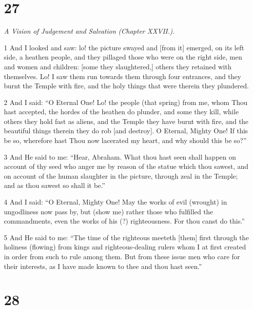 \chapter{27}

\par \textit{A Vision of Judgement and Salvation (Chapter XXVII.).}

\par 1 And I looked and saw: lo! the picture swayed and [from it] emerged, on its left side, a heathen people, and they pillaged those who were on the right side, men and women and children: [some they slaughtered,] others they retained with themselves. Lo! I saw them run towards them through four entrances, and they burnt the Temple with fire, and the holy things that were therein they plundered. 

\par 2 And I said: “O Eternal One! Lo! the people (that spring) from me, whom Thou hast accepted, the hordes of the heathen do plunder, and some they kill, while others they hold fast as aliens, and the Temple they have burnt with fire, and the beautiful things therein they do rob [and destroy]. O Eternal, Mighty One! If this be so, wherefore hast Thou now lacerated my heart, and why should this be so?”

\par 3 And He said to me: “Hear, Abraham. What thou hast seen shall happen on account of thy seed who anger me by reason of the statue which thou sawest, and on account of the human slaughter in the picture, through zeal in the Temple; and as thou sawest so shall it be.”

\par 4 And I said: “O Eternal, Mighty One! May the works of evil (wrought) in ungodliness now pass by, but (show me) rather those who fulfilled the commandments, even the works of his (?) righteousness. For thou canst do this.”

\par 5 And He said to me: “The time of the righteous meeteth [them] first through the holiness (flowing) from kings and righteous-dealing rulers whom I at first created in order from such to rule among them. But from these issue men who care for their interests, as I have made known to thee and thou hast seen.”

\chapter{28}

